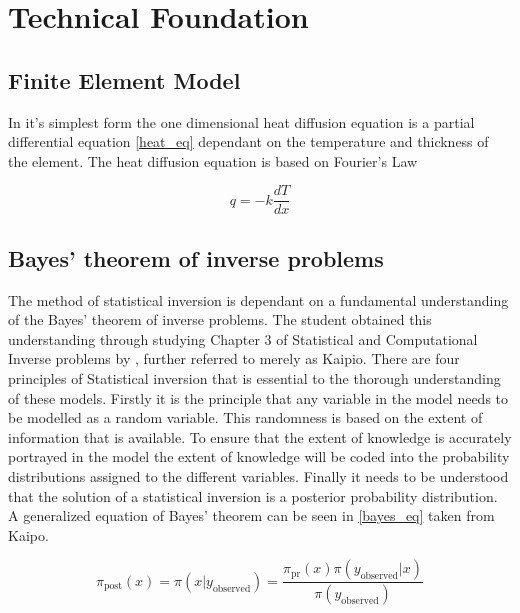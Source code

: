 \chapter{Technical Foundation} \label{tech}
\section{Finite Element Model}
	
	 
	 In it's simplest form the one dimensional heat diffusion equation is a partial differential equation \ref{heat_eq} dependant on the temperature and thickness of the element. 
	The heat diffusion equation is based on Fourier's Law
	
	
	\begin{equation}
	\label{heat_eq}
		q = -k \frac{dT}{dx}
	\end{equation}

\section{Bayes' theorem of inverse problems}
	The method of statistical inversion is dependant on a fundamental understanding of the Bayes' theorem of inverse problems. 
	The student obtained this understanding through studying Chapter 3 of Statistical and Computational Inverse problems by \citet{Kaipo:2005}, further referred to merely as Kaipio. 
	There are four principles of Statistical inversion that is essential to the thorough understanding of these models. 
	Firstly it is the principle that any variable in the model needs to be modelled as a random variable. 
	This randomness is based on the extent of information that is available. 
	To ensure that the extent of knowledge is accurately portrayed in the model the extent of knowledge will be coded into the probability distributions assigned to the different variables. 
	Finally it needs to be understood that the solution of a statistical inversion is a posterior probability distribution.
	A generalized equation of Bayes' theorem can be seen in \ref{bayes_eq} taken from Kaipo. 
	
	\begin{equation}
	\label{bayes_eq}
	\pi_{\text{post}}(x) = \pi(x|y_{\text{observed}}) = \frac{\pi_{\text{pr}}(x) \pi(y_{\text{observed}}|x)}{\pi (y_{\text{observed}})}	
	\end{equation}

